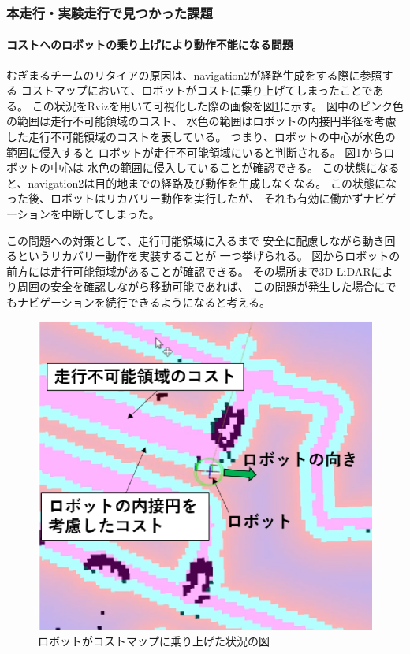 \subsubsection{本走行・実験走行で見つかった課題}
\paragraph{コストへのロボットの乗り上げにより動作不能になる問題}
むぎまるチームのリタイアの原因は、navigation2が経路生成をする際に参照する
コストマップにおいて、ロボットがコストに乗り上げてしまったことである。
この状況をRvizを用いて可視化した際の画像を図\ref{fig:mugimaru_result}に示す。
図中のピンク色の範囲は走行不可能領域のコスト、
水色の範囲はロボットの内接円半径を考慮した走行不可能領域のコストを表している。
つまり、ロボットの中心が水色の範囲に侵入すると
ロボットが走行不可能領域にいると判断される。
図\ref{fig:mugimaru_result}からロボットの中心は
水色の範囲に侵入していることが確認できる。
この状態になると、navigation2は目的地までの経路及び動作を生成しなくなる。
この状態になった後、ロボットはリカバリー動作を実行したが、
それも有効に働かずナビゲーションを中断してしまった。

この問題への対策として、走行可能領域に入るまで
安全に配慮しながら動き回るというリカバリー動作を実装することが
一つ挙げられる。
図からロボットの前方には走行可能領域があることが確認できる。
その場所まで3D LiDARにより周囲の安全を確認しながら移動可能であれば、
この問題が発生した場合にでもナビゲーションを続行できるようになると考える。
\begin{figure}[h]
  \begin{center}
  	\includegraphics[width=0.9\linewidth]{figs/mugimaru_result.eps}
  	\caption{ロボットがコストマップに乗り上げた状況の図} 
  	\label{fig:mugimaru_result}
  \end{center}
\end{figure}

